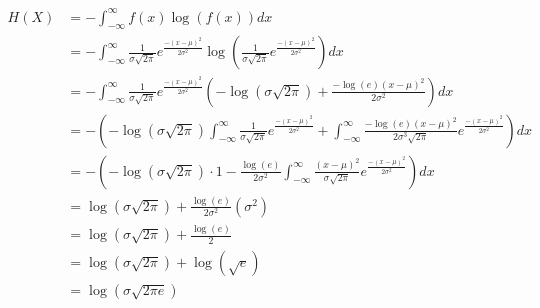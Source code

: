 \begin{align*}
H(X) &= -\int_{-\infty}^\infty f(x)\log\left(f(x)\right)dx\\
&= -\int_{-\infty}^\infty \frac{1}{\sigma\sqrt{2\pi}}e^{\frac{-(x-\mu)^2}{2\sigma^2}}\log\left(\frac{1}{\sigma\sqrt{2\pi}}e^{\frac{-(x-\mu)^2}{2\sigma^2}}\right)dx\\
&= -\int_{-\infty}^\infty \frac{1}{\sigma\sqrt{2\pi}}e^{\frac{-(x-\mu)^2}{2\sigma^2}}\left(-\log\left(\sigma\sqrt{2\pi}\right)+\frac{-\log\left(e\right)(x-\mu)^2}{2\sigma^2}\right)dx\\
&= -\left(-\log\left(\sigma\sqrt{2\pi}\right)\int_{-\infty}^\infty \frac{1}{\sigma\sqrt{2\pi}}e^{\frac{-(x-\mu)^2}{2\sigma^2}} + \int_{-\infty}^\infty \frac{-\log\left(e\right)(x-\mu)^2}{2\sigma^3\sqrt{2\pi}}e^{\frac{-(x-\mu)^2}{2\sigma^2}}\right)dx\\
&= -\left(-\log\left(\sigma\sqrt{2\pi}\right)\cdot 1 - \frac{\log\left(e\right)}{2\sigma^2}\int_{-\infty}^\infty \frac{(x-\mu)^2}{\sigma\sqrt{2\pi}}e^{\frac{-(x-\mu)^2}{2\sigma^2}}\right)dx\\
&= \log\left(\sigma\sqrt{2\pi}\right) + \frac{\log\left(e\right)}{2\sigma^2}\left(\sigma^2\right)\\
&= \log\left(\sigma\sqrt{2\pi}\right) + \frac{\log\left(e\right)}{2}\\
&= \log\left(\sigma\sqrt{2\pi}\right) + \log\left(\sqrt{e}\right)\\
&= \log\left(\sigma\sqrt{2\pi e}\right)\\
\end{align*}

